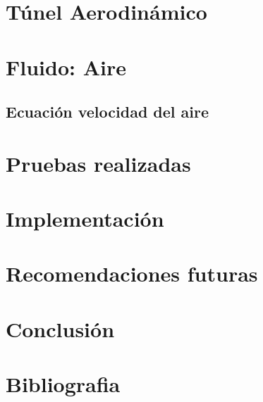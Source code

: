 \documentclass[12pt,a4paper]{article}
\begin{document}
	\section{Túnel Aerodinámico}
		
	
\newpage
	\section{Fluido: Aire}
	\subsection{Ecuación velocidad del aire} \label{sec:ecvel}
	
	\newpage
	
	\newpage
	\section{Pruebas realizadas}
	
	\newpage
	\section{Implementación} 
	
		\newpage
	\section{Recomendaciones futuras}
	
	\newpage
	\section{Conclusión}
	
	

		\newpage
	\section{Bibliografia}


\printbibliography

\newpage

\appendix
\clearpage
\appendixpage


\end{document}
